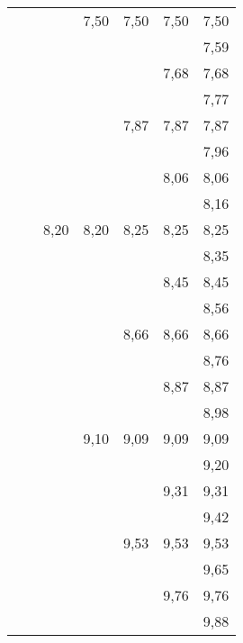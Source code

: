 \begin{tiny}
\begin{tabular}{@{}c@{ }c@{ }c@{ }c@{ }c@{ }c@{ }c}
     &      &      & 7,50 & 7,50 & 7,50 & 7,50 \\
     &      &      &      &      &      & 7,59 \\
     &      &      &      &      & 7,68 & 7,68 \\
     &      &      &      &      &      & 7,77 \\
     &      &      &      & 7,87 & 7,87 & 7,87 \\
     &      &      &      &      &      & 7,96 \\
     &      &      &      &      & 8,06 & 8,06 \\
     &      &      &      &      &      & 8,16 \\
     &      & 8,20 & 8,20 & 8,25 & 8,25 & 8,25 \\
     &      &      &      &      &      & 8,35 \\
     &      &      &      &      & 8,45 & 8,45 \\
     &      &      &      &      &      & 8,56 \\
     &      &      &      & 8,66 & 8,66 & 8,66 \\
     &      &      &      &      &      & 8,76 \\
     &      &      &      &      & 8,87 & 8,87 \\
     &      &      &      &      &      & 8,98 \\
     &      &      & 9,10 & 9,09 & 9,09 & 9,09 \\
     &      &      &      &      &      & 9,20 \\
     &      &      &      &      & 9,31 & 9,31 \\
     &      &      &      &      &      & 9,42 \\
     &      &      &      & 9,53 & 9,53 & 9,53 \\
     &      &      &      &      &      & 9,65 \\
     &      &      &      &      & 9,76 & 9,76 \\
     &      &      &      &      &      & 9,88 
\end{tabular}
\end{tiny}
